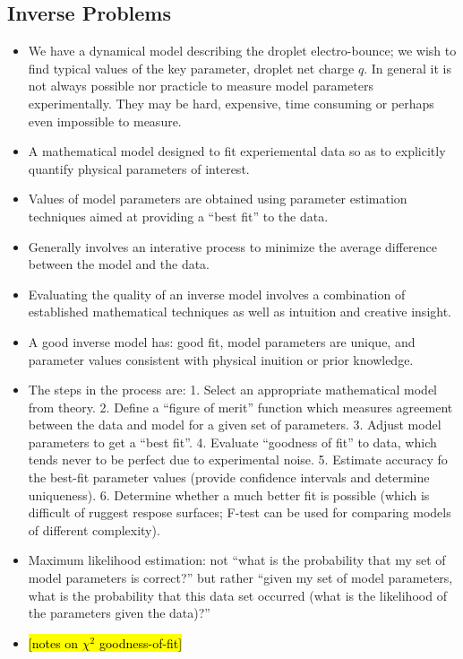 \documentclass[10pt,a4paper]{article}
\begin{document}
\subsection*{Inverse Problems}
\begin{itemize}
\item We have a dynamical model describing the droplet electro-bounce; we wish to find typical values of the key parameter, droplet net charge $q$. In general it is not always possible nor practicle to measure model parameters experimentally. They may be hard, expensive, time consuming or perhaps even impossible to measure. 
\item A mathematical model designed to fit experiemental data so as to explicitly quantify physical parameters of interest.
\item Values of model parameters are obtained using parameter estimation techniques aimed at providing a ``best fit'' to the data.
\item Generally involves an interative process to minimize the average difference between the model and the data.
\item Evaluating the quality of an inverse model involves a combination of established mathematical techniques as well as intuition and creative insight.
\item A good inverse model has: good fit, model parameters are unique, and parameter values consistent with physical inuition or prior knowledge.
\item The steps in the process are: 1. Select an appropriate mathematical model from theory. 2. Define a ``figure of merit'' function which measures agreement between the data and model for a given set of parameters. 3. Adjust model parameters to get a ``best fit''. 4. Evaluate ``goodness of fit'' to data, which tends never to be perfect due to experimental noise. 5. Estimate accuracy fo the best-fit parameter values (provide confidence intervals and determine uniqueness). 6. Determine whether a much better fit is possible (which is difficult of ruggest respose surfaces; F-test can be used for comparing models of different complexity).

\item Maximum likelihood estimation: not ``what is the probability that my set of model parameters is correct?'' but rather ``given my set of model parameters, what is the probability that this data set occurred (what is the likelihood of the parameters given the data)?''

\item \hl{[notes on $\chi^2$ goodness-of-fit]} 


\end{itemize}
\end{document}

